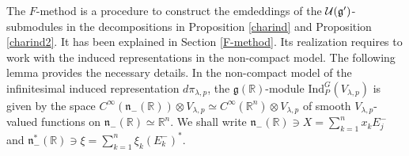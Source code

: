 \documentclass[a4paper,12pt,reqno]{amsart}
\numberwithin{theorem}{subsection}
\numberwithin{equation}{section}
\begin{document}
The $F$-method is a procedure to construct the emdeddings of the ${\fam2
U}({{\mathfrak g}}^\prime)$-submodules in the decompositions in Proposition \ref{charind}
and Proposition \ref{charind2}. It has been explained in Section
\ref{F-method}. Its realization requires to work with the induced
representations in the non-compact model. The following lemma provides the
necessary details. In the non-compact model of the infinitesimal induced
representation ${d}\pi_{\lambda,p}$, the ${{\mathfrak g}}({\mathbb{R}})$-module
$\mathrm{Ind}^G_P(V_{\lambda,p})$ is given by the space $C^\infty({{\mathfrak n}}_-({\mathbb{R}}))
\otimes V_{\lambda,p} \simeq C^\infty({\mathbb{R}}^n) \otimes V_{\lambda,p}$ of smooth
$V_{\lambda,p}$-valued functions on ${{\mathfrak n}}_-({\mathbb{R}}) \simeq {\mathbb{R}}^n$. We shall write
${{\mathfrak n}}_-({\mathbb{R}}) \ni X = \sum_{k=1}^n x_k E_j^-$ and ${{\mathfrak n}}_-^*({\mathbb{R}}) \ni \xi =
\sum_{k=1}^n \xi_k (E_k^-)^*$.
\end{document}
